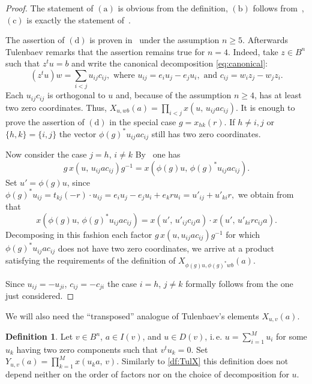 \documentclass[11pt]{amsart}
\theoremstyle{plain} \declaretheorem[name=Theorem, Refname={Theorem,Theorems}]{tm} \Crefname{tm}{Theorem}{Theorems}
\numberwithin{equation}{section}
\theoremstyle{definition} \newtheorem{df}[lm]{Definition} \Crefname{df}{Definition}{Definitions}
\theoremstyle{remark} \newtheorem{rk}[lm]{Remark} \Crefname{rk}{Remark}{Remarks}
\newcommand{\inv}{^{-1}}
\begin{document}
\begin{proof}
The statement of $(\mathrm a)$ is obvious from the definition, $(\mathrm b)$ follows from~\cite[Lemma~1.1\,d)]{Tul}, $(\mathrm c)$ is exactly the statement of~\cite[Lemma~1.3\,a)]{Tul}.

The assertion of $(\mathrm d)$ is proven in~\cite[Lemma~1.3\,b)]{Tul} under the assumption $n\geq5$. 
Afterwards Tulenbaev remarks that the assertion remains true for $n=4$. %
Indeed, take $z\in B^n$ such that $z^tu=b$ and write the canonical decomposition \eqref{eq:canonical}:
$$(z^tu)w=\sum_{i<j}u_{ij} c_{ij}, \text{ where } u_{ij}=e_iu_j-e_ju_i,\text{ and }c_{ij}=w_iz_j-w_jz_i.$$
Each $u_{ij} c_{ij}$ is orthogonal to $u$ and, because of the assumption $n\geq4$, has at least two zero coordinates.
Thus, $X_{u,wb}(a)=\prod_{i<j}x(u,\, u_{ij} ac_{ij})$. 
It is enough to prove the assertion of $(\mathrm d)$ in the special case $g=x_{hk}(r)$.
If $h\neq i,j$ or $\{h,k\}=\{i,j\}$ the vector $\phi(g)^*u_{ij}ac_{ij}$ still has two zero coordinates.

Now consider the case $j=h$, $i\neq k$
By~\cite[3.12]{vdK} one has $$g\,x(u,\,u_{ij}ac_{ij})g\inv=x(\phi(g)u,\,\phi(g)^*u_{ij}ac_{ij}).$$
Set $u' = \phi(g)u$, since
$\phi(g)^*u_{ij} = t_{kj}(-r) \cdot u_{ij} = e_iu_j - e_ju_i + e_kru_i =u'_{ij}+u'_{ki}r,$ 
we obtain from~\cite[3.11]{vdK} that
$$x(\phi(g)u,\,\phi(g)^* u_{ij} ac_{ij})=x\left(u',\,u'_{ij}c_{ij}a\right)\cdot x\left(u',\,u'_{ki} rc_{ij}a\right).$$
Decomposing in this fashion each factor $g\,x(u,u_{ij}ac_{ij})g^{-1}$ for which $\phi(g)^*u_{ij}ac_{ij}$ does not have two zero coordinates, 
 we arrive at a product satisfying the requirements of the definition of $X_{\phi(g)u,\phi(g)^*wb}(a)$.

 Since $u_{ij} = - u_{ji}$, $c_{ij}= - c_{ji}$ the case $i=h$, $j\neq k$ formally follows from the one just considered. \end{proof}

We will also need the ``transposed'' analogue of Tulenbaev's elements $X_{u,v}(a)$.
\begin{df} \label{df:TulY}
Let $v\in B^n$, $a\in I(v)$, and $u \in D(v)$, i.\,e. $u = \sum\limits_{i=1}^M u_i$ for some $u_k$ having two zero components such that $v^tu_k=0$.
Set $Y_{u,v}(a)=\prod_{k=1}^Mx(u_ka,\,v)$. 
Similarly to \cref{df:TulX} this definition does not depend neither on the order of factors nor on the choice of decomposition for $u$.
\end{df}
\end{document}
